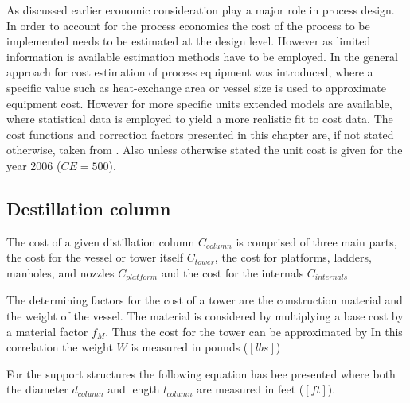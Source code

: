 As discussed earlier economic consideration play a major role in process design. In order to account
for the process economics the cost of the process to be implemented needs to be estimated at the design
level. However as limited information is available estimation methods have to be employed. In
 the general approach for cost estimation of process equipment was
introduced, where a specific value such as heat-exchange area or vessel size is used to approximate
equipment cost. However for more specific units extended models are available, where statistical
data is employed to yield a more realistic fit to cost data. The cost functions and correction
factors presented in this chapter are, if not stated otherwise, taken from \cite{Seider.2010}.
Also unless otherwise stated the unit cost is given for the year 2006 ($CE = 500$).
	
\subsection{Destillation column}
    The cost of a given distillation column $C_{column}$ is comprised of three main parts, the cost 
    for the vessel or tower itself $C_{tower}$, the cost for platforms, ladders, manholes, and nozzles
    $C_{platform}$ and the cost for the internals $C_{internals}$
	
    The determining factors for the cost of a tower are the construction material and the weight of the vessel. 
    The material is considered by multiplying a base cost by a material factor $f_M$. Thus the cost for 
    the tower can be approximated by
    In this correlation the weight $W$ is measured in pounds ($[lbs]$)
    
    For the support structures the following equation has bee presented 
    where both the diameter $d_{column}$ and length $l_{column}$ are measured in feet ($[ft]$). 
	
